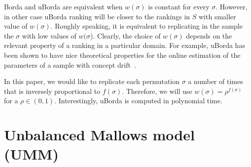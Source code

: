 \documentclass[runningheads]{llncs}
\begin{document}
Borda and uBorda are equivalent when $w(\sigma)$ is constant for every $\sigma$. However, in other case uBorda ranking will be closer to the rankings in $S$ with smaller value of $w(\sigma)$. Roughly speaking, it is equivalent to replicating in the sample the $\sigma$ with low values of $w(\sigma$).
Clearly, the choice of  $w(\sigma)$ depends on the relevant property of a ranking in a particular domain. For example, uBorda has been shown to have nice theoretical properties for the online estimation of the parameters of a sample with concept drift~\cite{}. 

In this paper, we would like to replicate each permutation $\sigma$ a number of times that is inversely proportional to $f(\sigma)$. Therefore, we will use $w(\sigma)=\rho^{f(\sigma)}$ for a $\rho\in(0,1)$. Interestingly, uBorda is computed in polynomial time.

\renewcommand{\subsubsection}{\smallskip{}\noindent\textbf}

\section{Unbalanced Mallows model (UMM)}

\end{document}
